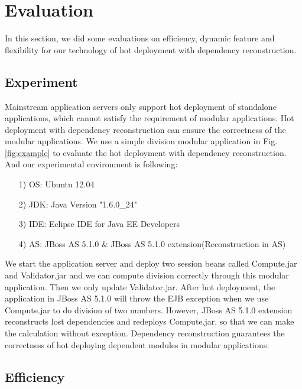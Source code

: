 \documentclass[conference]{IEEEtran}
\begin{document}
\section{Evaluation\label{sec:evaluation}}
In this section, we did some evaluations on efficiency, dynamic feature and flexibility for our technology of hot deployment with dependency reconstruction.

\subsection{Experiment}
Mainstream application servers only support hot deployment of standalone applications, which cannot satisfy the requirement of modular applications.
Hot deployment with dependency reconstruction can ensure the correctness of the modular applications.
We use a simple division modular application in Fig. \ref{fig:example} to evaluate the hot deployment with dependency reconstruction.
And our experimental environment is following:
\begin{itemize}[]
\item[1)] OS: Ubuntu 12.04
\item[2)] JDK: Java Version "1.6.0\_24"
\item[3)] IDE: Eclipse IDE for Java EE Developers
\item[4)] AS: JBoss AS 5.1.0 \& JBoss AS 5.1.0 extension(Reconstruction in AS)
\end{itemize}

We start the application server and deploy two session beans called Compute.jar and Validator.jar and we can compute division correctly through this modular application.
Then we only update Validator.jar.
After hot deployment, the application in JBoss AS 5.1.0 will throw the EJB exception when we use Compute.jar to do division of two numbers.
However, JBoss AS 5.1.0 extension reconstructs lost dependencies and redeploys Compute.jar, so that we can make the calculation without exception.
Dependency reconstruction guarantees the correctness of hot deploying dependent modules in modular applications.

\subsection{Efficiency}
\end{document}
